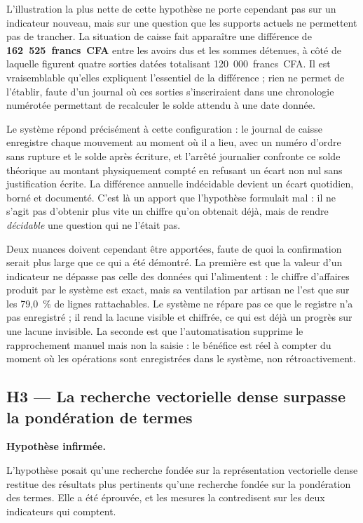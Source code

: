 L'illustration la plus nette de cette hypothèse ne porte cependant pas sur un indicateur nouveau, mais sur une question que les supports actuels ne permettent pas de trancher. La situation de caisse fait apparaître une différence de \textbf{162~525~francs~CFA} entre les avoirs dus et les sommes détenues, à côté de laquelle figurent quatre sorties datées totalisant 120~000~francs~CFA. Il est vraisemblable qu'elles expliquent l'essentiel de la différence ; rien ne permet de l'établir, faute d'un journal où ces sorties s'inscriraient dans une chronologie numérotée permettant de recalculer le solde attendu à une date donnée.

Le système répond précisément à cette configuration : le journal de caisse enregistre chaque mouvement au moment où il a lieu, avec un numéro d'ordre sans rupture et le solde après écriture, et l'arrêté journalier confronte ce solde théorique au montant physiquement compté en refusant un écart non nul sans justification écrite. La différence annuelle indécidable devient un écart quotidien, borné et documenté. C'est là un apport que l'hypothèse formulait mal : il ne s'agit pas d'obtenir plus vite un chiffre qu'on obtenait déjà, mais de rendre \emph{décidable} une question qui ne l'était pas.

Deux nuances doivent cependant être apportées, faute de quoi la confirmation serait plus large que ce qui a été démontré. La première est que la valeur d'un indicateur ne dépasse pas celle des données qui l'alimentent : le chiffre d'affaires produit par le système est exact, mais sa ventilation par artisan ne l'est que sur les 79,0~\% de lignes rattachables. Le système ne répare pas ce que le registre n'a pas enregistré ; il rend la lacune visible et chiffrée, ce qui est déjà un progrès sur une lacune invisible. La seconde est que l'automatisation supprime le rapprochement manuel mais non la saisie : le bénéfice est réel à compter du moment où les opérations sont enregistrées dans le système, non rétroactivement.

\subsection{H3 --- La recherche vectorielle dense surpasse la pondération de termes}

\noindent\textbf{Hypothèse infirmée.}

L'hypothèse posait qu'une recherche fondée sur la représentation vectorielle dense restitue des résultats plus pertinents qu'une recherche fondée sur la pondération des termes. Elle a été éprouvée, et les mesures la contredisent sur les deux indicateurs qui comptent.

